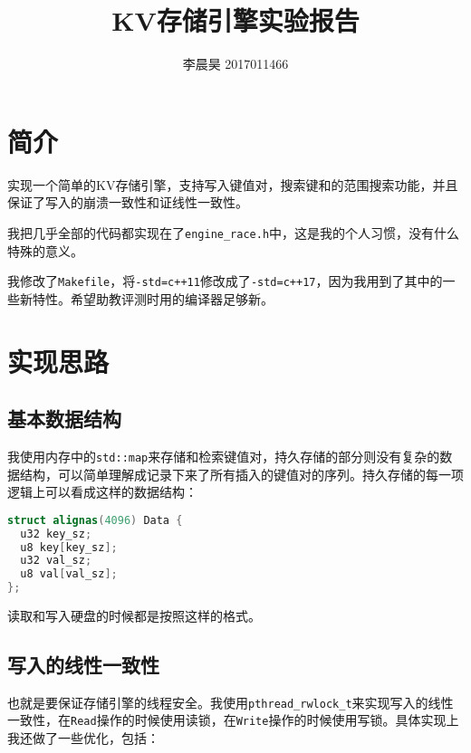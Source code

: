 \documentclass[12pt, UTF8]{article}
\title{KV存储引擎实验报告}
\author{李晨昊 2017011466}
\begin{document}
\maketitle
\tableofcontents

\section{简介}

实现一个简单的KV存储引擎，支持写入键值对，搜索键和的范围搜索功能，并且保证了写入的崩溃一致性和证线性一致性。

我把几乎全部的代码都实现在了\lstinline|engine_race.h|中，这是我的个人习惯，没有什么特殊的意义。

我修改了\lstinline|Makefile|，将\lstinline|-std=c++11|修改成了\lstinline|-std=c++17|，因为我用到了其中的一些新特性。希望助教评测时用的编译器足够新。

\section{实现思路}

\subsection{基本数据结构}

我使用内存中的\lstinline|std::map|来存储和检索键值对，持久存储的部分则没有复杂的数据结构，可以简单理解成记录下来了所有插入的键值对的序列。持久存储的每一项逻辑上可以看成这样的数据结构：

\begin{lstlisting}[language = C++, morekeywords = { u8, u32, alignas }]
struct alignas(4096) Data {
  u32 key_sz;
  u8 key[key_sz];
  u32 val_sz;
  u8 val[val_sz];
};
\end{lstlisting}

读取和写入硬盘的时候都是按照这样的格式。

\subsection{写入的线性一致性}

也就是要保证存储引擎的线程安全。我使用\lstinline|pthread_rwlock_t|来实现写入的线性一致性，在\lstinline|Read|操作的时候使用读锁，在\lstinline|Write|操作的时候使用写锁。具体实现上我还做了一些优化，包括：
\end{document}
